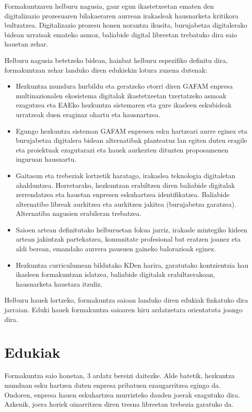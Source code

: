 Formakuntzaren helburu nagusia, gaur egun ikastetxeetan ematen den digitalizazio prozesuaren bilakaeraren aurrean irakasleak hausnarketa kritikora bultzatzea. Digitalizazio prozesu honen norantza ikusita, burujabetza digitalerako bidean urratsak emateko asmoz, baliabide digital libreetan trebatuko dira saio hauetan zehar.

Helburu nagusia betetzeko bidean, hainbat helburu espezifiko definitu dira, formakuntzan zehar landuko diren edukiekin lotura zuzena dutenak:
\begin{itemize}
    \item Hezkuntza mundura hurbildu eta geratzeko etorri diren GAFAM enpresa multinazionalen ekosistema digitalak ikastetxeetan txertatzeko asmoak ezagutzea eta EAEko hezkuntza sistemaren eta gure ikasleen eskubideak urratzeak duen eraginaz ohartu eta hausnartzea.
    \item Egungo hezkuntza sisteman GAFAM enpresen esku hartzeari aurre eginez eta burujabetza digitalera bidean alternatibak planteatuz lan egiten duten eragile eta proiektuak ezagutarazi eta hauek aurkezten dituzten proposamenen inguruan hausnartu.
    \item Gaitasun eta trebeziak lortzetik haratago, irakaslea teknologia digitaletan ahalduntzea. Horretarako, hezkuntzan erabiltzen diren baliabide digitalak zerrendatzea eta hauetan enpresen eskuhartzea identifikatzea. Baliabide alternatibo libreak aurkitzea eta aurkitzen jakitea (burujabetza garatzea). Alternatiba nagusien erabileran trebatzea.
    \item Saioen artean definitutako helburuetan fokua jarriz, irakasle mintegiko kideen artean jakintzak partekatzea, komunitate profesional bat eratzen joanez eta aldi berean, emandako aurrera pausuen gaineko balorazioak eginez.
    \item Hezkuntza curriculumean bildutako KDen harira, garatutako kontzientzia hau ikasleen formakuntzan islatzea, baliabide digitalak erabiltzerakoan, hausnarketa hauetara itzuliz.
\end{itemize}

Helburu hauek lortzeko, formakuntza saioan landuko diren edukiak finkatuko dira jarraian. Eduki hauek formakuntza saioaren hiru ardatzetara orientatuta joango dira.

\newpage
\section{Edukiak}

Formakuntza saio honetan, 3 ardatz bereizi daitezke. Alde batetik, hezkuntza munduan esku hartzen duten enpresa pribatuen ezaugarritzea egingo da. Ondoren, enpresa hauen eskuhartzea murrizteko dauden joerak ezagutuko dira. Azkenik, joera horiek oinarritzen diren tresna libreetan trebezia garatuko da.

